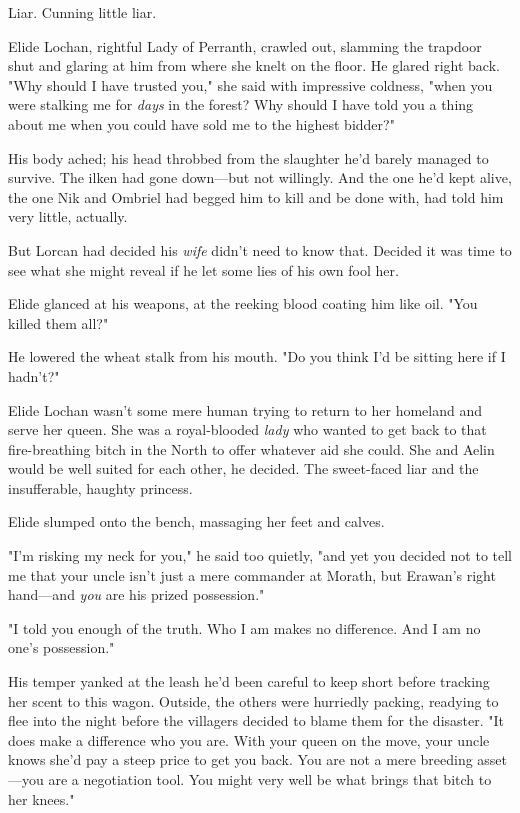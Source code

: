 Liar.
Cunning little liar.

Elide Lochan, rightful Lady of Perranth, crawled out, slamming the trapdoor shut and glaring at him from where she knelt on the floor.
He glared right back.
"Why should I have trusted you," she said with impressive coldness, "when you were stalking me for \emph{days} in the forest?
Why should I have told you a thing about me when you could have sold me to the highest bidder?"

His body ached; his head throbbed from the slaughter he'd barely managed to survive.
The ilken had gone down---but not willingly.
And the one he'd kept alive, the one Nik and Ombriel had begged him to kill and be done with, had told him very little, actually.

But Lorcan had decided his \emph{wife} didn't need to know that.
Decided it was time to see what she might reveal if he let some lies of his own fool her.

Elide glanced at his weapons, at the reeking blood coating him like oil.
"You killed them all?"

He lowered the wheat stalk from his mouth.
"Do you think I'd be sitting here if I hadn't?"

Elide Lochan wasn't some mere human trying to return to her homeland and serve her queen.
She was a royal-blooded \emph{lady} who wanted to get back to that fire-breathing bitch in the North to offer whatever aid she could.
She and Aelin would be well suited for each other, he decided.
The sweet-faced liar and the insufferable, haughty princess.

Elide slumped onto the bench, massaging her feet and calves.

"I'm risking my neck for you," he said too quietly, "and yet you decided not to tell me that your uncle isn't just a mere commander at Morath, but Erawan's right hand---and \emph{you} are his prized possession."

"I told you enough of the truth.
Who I am makes no difference.
And I am no one's possession."

His temper yanked at the leash he'd been careful to keep short before tracking her scent to this wagon.
Outside, the others were hurriedly packing, readying to flee into the night before the villagers decided to blame them for the disaster.
"It does make a difference who you are.
With your queen on the move, your uncle knows she'd pay a steep price to get you back.
You are not a mere breeding asset---you are a negotiation tool.
You might very well be what brings that bitch to her knees."

